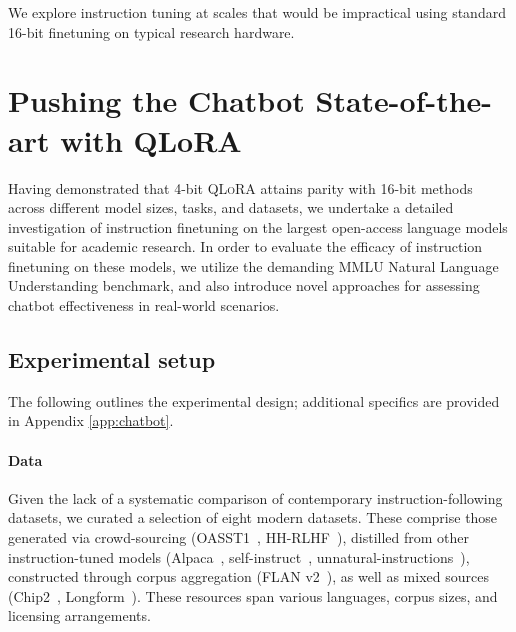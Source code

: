 We explore instruction tuning at scales that would be impractical using standard 16-bit finetuning on typical research hardware.

\section{Pushing the Chatbot State-of-the-art with QLoRA}
\label{sec:pushing}
Having demonstrated that 4-bit \textsc{QLoRA} attains parity with 16-bit methods across different model sizes, tasks, and datasets, we undertake a detailed investigation of instruction finetuning on the largest open-access language models suitable for academic research. In order to evaluate the efficacy of instruction finetuning on these models, we utilize the demanding MMLU Natural Language Understanding benchmark, and also introduce novel approaches for assessing chatbot effectiveness in real-world scenarios.

\subsection{Experimental setup} The following outlines the experimental design; additional specifics are provided in Appendix \ref{app:chatbot}.

\paragraph{Data} Given the lack of a systematic comparison of contemporary instruction-following datasets, we curated a selection of eight modern datasets. These comprise those generated via crowd-sourcing (OASST1~\citep{kopf2023openassistant}, HH-RLHF~\citep{bai2022training}), distilled from other instruction-tuned models (Alpaca~\citep{alpaca}, self-instruct~\citep{wang2022self}, unnatural-instructions~\citep{honovich2022unnatural}), constructed through corpus aggregation (FLAN v2~\citep{chung2022scaling}), as well as mixed sources (Chip2~\citep{laion2023}, Longform~\citep{koksal2023longform}). These resources span various languages, corpus sizes, and licensing arrangements.

